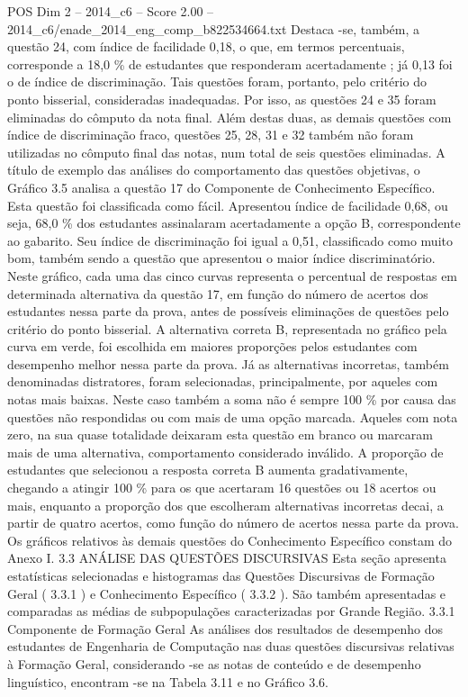 \begin{textsample}{POS Dim 2 – 2014\_c6 – Score 2.00 – 2014\_c6/enade\_2014\_eng\_comp\_b822534664.txt}
Destaca -se, também, a questão 24, com índice de facilidade 0,18, o que, em termos percentuais, corresponde a 18,0 \% de estudantes que responderam acertadamente ; já 0,13 foi o de índice de discriminação.
Tais questões foram, portanto, pelo critério do ponto bisserial, consideradas inadequadas.
Por isso, as questões 24 e 35 foram eliminadas do cômputo da nota final.
Além destas duas, as demais questões com índice de discriminação fraco, questões 25, 28, 31 e 32 também não foram utilizadas no cômputo final das notas, num total de seis questões eliminadas.
A título de exemplo das análises do comportamento das questões objetivas, o Gráfico 3.5 analisa a questão 17 do Componente de Conhecimento Específico.
Esta questão foi classificada como fácil.
Apresentou índice de facilidade 0,68, ou seja, 68,0 \% dos estudantes assinalaram acertadamente a opção B, correspondente ao gabarito.
Seu índice de discriminação foi igual a 0,51, classificado como muito bom, também sendo a questão que apresentou o maior índice discriminatório.
Neste gráfico, cada uma das cinco curvas representa o percentual de respostas em determinada alternativa da questão 17, em função do número de acertos dos estudantes nessa parte da prova, antes de possíveis eliminações de questões pelo critério do ponto bisserial.
A alternativa correta B, representada no gráfico pela curva em verde, foi escolhida em maiores proporções pelos estudantes com desempenho melhor nessa parte da prova.
Já as alternativas incorretas, também denominadas distratores, foram selecionadas, principalmente, por aqueles com notas mais baixas.
Neste caso também a soma não é sempre 100 \% por causa das questões não respondidas ou com mais de uma opção marcada.
Aqueles com nota zero, na sua quase totalidade deixaram esta questão em branco ou marcaram mais de uma alternativa, comportamento considerado inválido.
A proporção de estudantes que selecionou a resposta correta B aumenta gradativamente, chegando a atingir 100 \% para os que acertaram 16 questões ou 18 acertos ou mais, enquanto a proporção dos que escolheram alternativas incorretas decai, a partir de quatro acertos, como função do número de acertos nessa parte da prova.
Os gráficos relativos às demais questões do Conhecimento Específico constam do Anexo I. 3.3 ANÁLISE DAS QUESTÕES DISCURSIVAS Esta seção apresenta estatísticas selecionadas e histogramas das Questões Discursivas de Formação Geral ( 3.3.1 ) e Conhecimento Específico ( 3.3.2 ).
São também apresentadas e comparadas as médias de subpopulações caracterizadas por Grande Região. 3.3.1 Componente de Formação Geral As análises dos resultados de desempenho dos estudantes de Engenharia de Computação nas duas questões discursivas relativas à Formação Geral, considerando -se as notas de conteúdo e de desempenho linguístico, encontram -se na Tabela 3.11 e no Gráfico 3.6.

\end{textsample}
